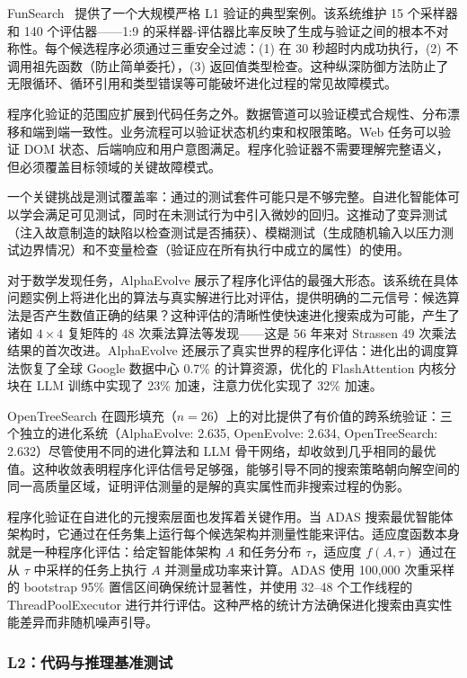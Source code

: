 FunSearch~\citep{funsearch2024} 提供了一个大规模严格 L1 验证的典型案例。该系统维护 15 个采样器和 140 个评估器——1:9 的采样器-评估器比率反映了生成与验证之间的根本不对称性。每个候选程序必须通过三重安全过滤：(1) 在 30 秒超时内成功执行，(2) 不调用祖先函数（防止简单委托），(3) 返回值类型检查。这种纵深防御方法防止了无限循环、循环引用和类型错误等可能破坏进化过程的常见故障模式。

程序化验证的范围应扩展到代码任务之外。数据管道可以验证模式合规性、分布漂移和端到端一致性。业务流程可以验证状态机约束和权限策略。Web 任务可以验证 DOM 状态、后端响应和用户意图满足。程序化验证器不需要理解完整语义，但必须覆盖目标领域的关键故障模式。

一个关键挑战是测试覆盖率：通过的测试套件可能只是不够完整。自进化智能体可以学会满足可见测试，同时在未测试行为中引入微妙的回归。这推动了变异测试（注入故意制造的缺陷以检查测试是否捕获）、模糊测试（生成随机输入以压力测试边界情况）和不变量检查（验证应在所有执行中成立的属性）的使用。

对于数学发现任务，AlphaEvolve 展示了程序化评估的最强大形态。该系统在具体问题实例上将进化出的算法与真实解进行比对评估，提供明确的二元信号：候选算法是否产生数值正确的结果？这种评估的清晰性使快速进化搜索成为可能，产生了诸如 $4\times4$ 复矩阵的 48 次乘法算法等发现——这是 56 年来对 Strassen 49 次乘法结果的首次改进。AlphaEvolve 还展示了真实世界的程序化评估：进化出的调度算法恢复了全球 Google 数据中心 0.7\% 的计算资源，优化的 FlashAttention 内核分块在 LLM 训练中实现了 23\% 加速，注意力优化实现了 32\% 加速。

OpenTreeSearch 在圆形填充（$n=26$）上的对比提供了有价值的跨系统验证：三个独立的进化系统（AlphaEvolve: 2.635, OpenEvolve: 2.634, OpenTreeSearch: 2.632）尽管使用不同的进化算法和 LLM 骨干网络，却收敛到几乎相同的最优值。这种收敛表明程序化评估信号足够强，能够引导不同的搜索策略朝向解空间的同一高质量区域，证明评估测量的是解的真实属性而非搜索过程的伪影。

程序化验证在自进化的元搜索层面也发挥着关键作用。当 ADAS 搜索最优智能体架构时，它通过在任务集上运行每个候选架构并测量性能来评估。适应度函数本身就是一种程序化评估：给定智能体架构 $A$ 和任务分布 $\tau$，适应度 $f(A, \tau)$ 通过在从 $\tau$ 中采样的任务上执行 $A$ 并测量成功率来计算。ADAS 使用 100,000 次重采样的 bootstrap 95\% 置信区间确保统计显著性，并使用 32--48 个工作线程的 ThreadPoolExecutor 进行并行评估。这种严格的统计方法确保进化搜索由真实性能差异而非随机噪声引导。


\subsubsection{L2：代码与推理基准测试}
\label{sec:eval-L2}

